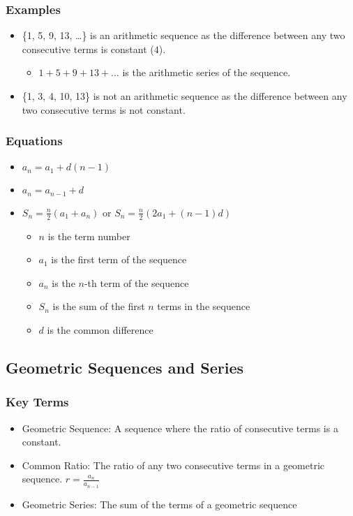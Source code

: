 \documentclass[12pt]{article}
\begin{document}
\subsubsection{Examples}
\begin{itemize}
    \item \{1, 5, 9, 13, \dots\} is an arithmetic sequence as the difference between any two consecutive terms is constant ($4$).
    \begin{itemize}
        \item $1 + 5 + 9 + 13 + \dots$ is the arithmetic series of the sequence.
    \end{itemize}
    \item \{1, 3, 4, 10, 13\} is not an arithmetic sequence as the difference between any two consecutive terms is not constant.
\end{itemize}

\subsubsection{Equations}
\begin{itemize}
    \item $a_n = a_1 + d(n-1)$
    \item $a_n = a_{n-1} + d$
    \item $S_n = \frac{n}{2}(a_1 + a_n)$ or $S_n = \frac{n}{2}(2a_1 + (n-1)d)$
    \begin{itemize}
        \item $n$ is the term number
        \item $a_1$ is the first term of the sequence
        \item $a_n$ is the $n$-th term of the sequence
        \item $S_n$ is the sum of the first $n$ terms in the sequence
        \item $d$ is the common difference
    \end{itemize}
\end{itemize}

\subsection{Geometric Sequences and Series}
\subsubsection{Key Terms}
\begin{itemize}
    \item Geometric Sequence: A sequence where the ratio of consecutive terms is a constant.
    \item Common Ratio: The ratio of any two consecutive terms in a geometric sequence. $r = \frac{a_n}{a_{n-1}}$
    \item Geometric Series: The sum of the terms of a geometric sequence
\end{itemize}
\end{document}
